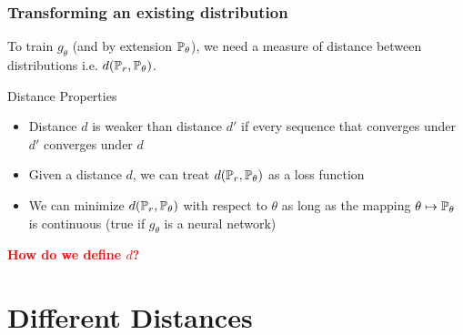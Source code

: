 \documentclass{beamer}
\begin{document}
\begin{frame}
\frametitle{Transforming an existing distribution}

To train $g_{\theta}$ (and by extension $\P_{\theta}$), we need a measure of distance between distributions i.e. $d(\P_{r},\P_{\theta})$.
\pause
\begin{block}{Distance Properties}
\begin{itemize}
\pause
\item{Distance $d$ is weaker than distance $d'$ if every sequence that converges under $d'$ converges under $d$}
\pause
\item{Given a distance $d$, we can treat $d(\P_{r},\P_{\theta})$ as a loss function}
\pause
\item{We can minimize $d(\P_{r},\P_{\theta})$ with respect to $\theta$ as long as the mapping $\theta \mapsto \P_{\theta}$ is continuous (true if $g_{\theta}$ is a neural network)}

\end{itemize}
\end{block}
\pause
\begin{center}
\textcolor{red}{\textbf{How do we define $d$?}}
\end{center}

\end{frame}

\section{Different Distances}

\begin{frame}
\tableofcontents[currentsection]
\end{frame}
\end{document}
